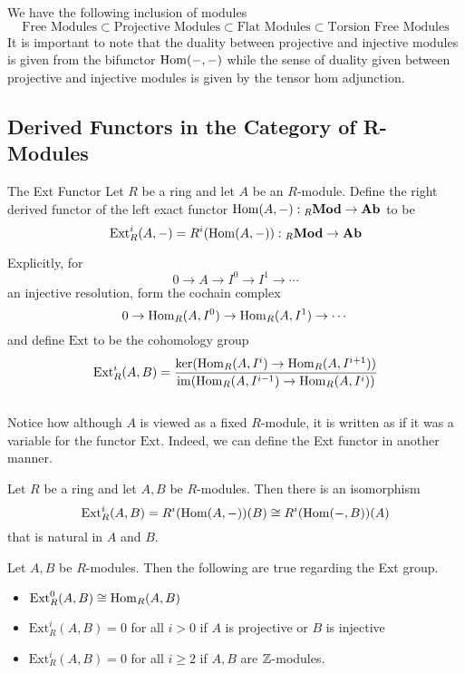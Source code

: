 \documentclass[a4paper]{article}
\begin{document}
We have the following inclusion of modules $$\text{Free Modules}\subset\text{Projective Modules}\subset\text{Flat Modules}\subset\text{Torsion Free Modules}$$ It is important to note that the duality between projective and injective modules is given from the bifunctor $\operatorname{Hom}(-,-)$ while the sense of duality given between projective and injective modules is given by the tensor hom adjunction. 

\subsection{Derived Functors in the Category of R-Modules}
\begin{defn}{The Ext Functor}{} Let $R$ be a ring and let $A$ be an $R$-module. Define the right derived functor of the left exact functor $\operatorname{Hom}(A,-):{_R\bold{Mod}}\to\bold{Ab}$ to be $$\text{Ext}_R^i(A,-)=R^i(\operatorname{Hom}(A,-)):{_R\bold{Mod}}\to\bold{Ab}$$ 
\end{defn}

Explicitly, for $$0\to A\to I^0\to I^1\to\cdots$$ an injective resolution, form the cochain complex $$0\to\operatorname{Hom}_R(A,I^0)\to\operatorname{Hom}_R(A,I^1)\to\cdots$$ and define $\text{Ext}$ to be the cohomology group $$\text{Ext}_R^i(A,B)=\frac{\ker(\operatorname{Hom}_R(A,I^i)\to\operatorname{Hom}_R(A,I^{i+1}))}{\operatorname{im}(\operatorname{Hom}_R(A,I^{i-1})\to\operatorname{Hom}_R(A,I^i))}$$~\\

Notice how although $A$ is viewed as a fixed $R$-module, it is written as if it was a variable for the functor $\text{Ext}$. Indeed, we can define the Ext functor in another manner. 

\begin{thm}{}{} Let $R$ be a ring and let $A,B$ be $R$-modules. Then there is an isomorphism $$\text{Ext}_R^i(A,B)=R^i(\operatorname{Hom}(A,-))(B)\cong R^i(\operatorname{Hom}(-,B))(A)$$ that is natural in $A$ and $B$. 
\end{thm}

\begin{thm}{}{} Let $A,B$ be $R$-modules. Then the following are true regarding the Ext group. 
\begin{itemize}
\item $\text{Ext}_R^0(A,B)\cong\operatorname{Hom}_R(A,B)$
\item $\text{Ext}_R^i(A,B)=0$ for all $i>0$ if $A$ is projective or $B$ is injective
\item $\text{Ext}_R^i(A,B)=0$ for all $i\geq 2$ if $A,B$ are $\mathbb{Z}$-modules. 
\end{itemize}
\end{thm}
\end{document}
